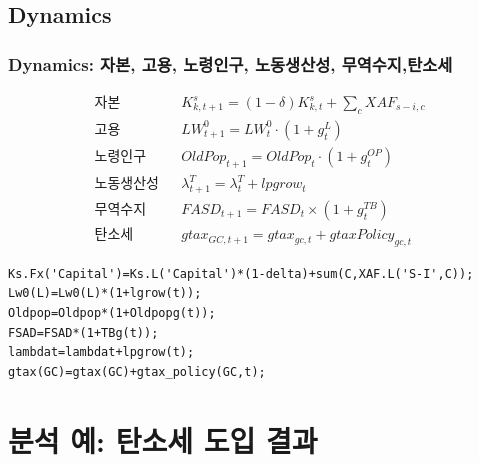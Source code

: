 \documentclass[10pt,compress,slidetop,%
			   hyperref={unicode},xcolor={svgnames},%
			   t]{beamer}
\begin{document}
\subsection{Dynamics}


\begin{frame}[fragile]
\frametitle{Dynamics: 자본, 고용, 노령인구, 노동생산성, 무역수지,탄소세}
\begin{scriptsize}
\begin{eqnarray*}
\mbox{자본}& &K^s_{k,t+1}=(1-\delta)K^s_{k,t}+\sum_cXAF_{s-i,c}\\
\mbox{고용}& &LW^0_{t+1}=LW^0_t\cdot(1+g^L_t)\\
\mbox{노령인구}& &OldPop_{t+1}=OldPop_{t}\cdot(1+g^{OP}_t)\\
\mbox{노동생산성}& &\lambda^{T}_{t+1}=\lambda^{T}_t+lpgrow_t\\
\mbox{무역수지}& &FASD_{t+1}=FASD_t\times(1+g^{TB}_t)\\
\mbox{탄소세}& &gtax_{GC,t+1}=gtax_{gc,t}+gtaxPolicy_{gc,t}
\end{eqnarray*}


\begin{verbatim}
Ks.Fx('Capital')=Ks.L('Capital')*(1-delta)+sum(C,XAF.L('S-I',C));
Lw0(L)=Lw0(L)*(1+lgrow(t));
Oldpop=Oldpop*(1+Oldpopg(t));
FSAD=FSAD*(1+TBg(t));
lambdat=lambdat+lpgrow(t);
gtax(GC)=gtax(GC)+gtax_policy(GC,t);
\end{verbatim}

\end{scriptsize}
\end{frame}
\section{분석 예: 탄소세 도입 결과}
\end{document}
